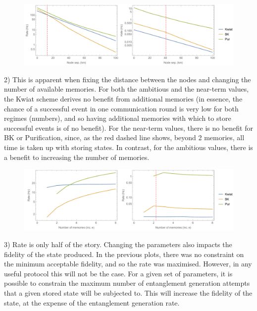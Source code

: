 \documentclass[aps,pra,superscriptaddress,preprint]{revtex4-1}
\begin{document}
\begin{figure}[htbp]
\begin{center}
\includegraphics[width=16.0cm]{AmbAndNearValuesRateVsDistance.pdf}
\caption{}
\label{fig:AmbAndNearValuesRateVsDistance}
\end{center}
\end{figure}

2) This is apparent when fixing the distance between the nodes and changing the number of available memories. For both the ambitious and the near-term values, the Kwiat scheme derives no benefit from additional memories (in essence, the chance of a successful event in one communication round is very low for both regimes (numbers), and so having additional memories with which to store successful events is of no benefit). For the near-term values, there is no benefit for BK or Purification, since, as the red dashed line shows, beyond 2 memories, all time is taken up with storing states. In contrast, for the ambitious values, there is a benefit to increasing the number of memories.

\begin{figure}[htbp]
\begin{center}
\includegraphics[width=16.0cm]{AmbAndNearValuesRateVsMemories.pdf}
\caption{}
\label{fig:AmbAndNearValuesRateVsMemories}
\end{center}
\end{figure}

3) Rate is only half of the story. Changing the parameters also impacts the fidelity of the state produced. In the previous plots, there was no constraint on the minimum acceptable fidelity, and so the rate was maximised. However, in any useful protocol this will not be the case. For a given set of parameters, it is possible to constrain the maximum number of entanglement generation attempts that a given stored state will be subjected to. This will increase the fidelity of the state, at the expense of the entanglement generation rate.
\end{document}
